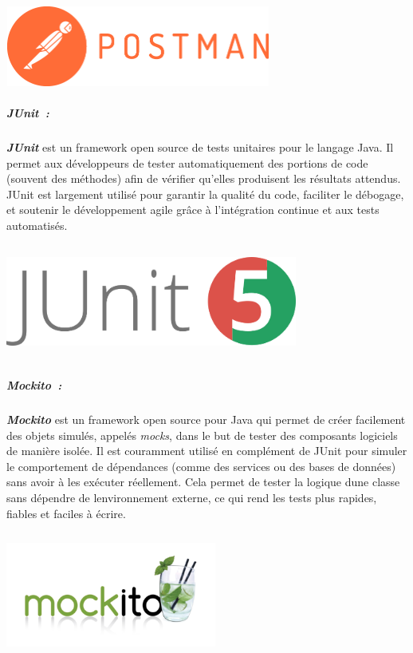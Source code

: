 \documentclass[12pt,a4paper,twoside]{report}
\begin{document}
\includegraphics[width=3.43681in,height=1.03958in]{latex_media/media/image33.png}

\hypertarget{junit}{%
\subparagraph{JUnit~:}\label{junit}}

\emph{\textbf{JUnit}} est un framework open source de tests unitaires
pour le langage Java. Il permet aux développeurs de tester
automatiquement des portions de code (souvent des méthodes) afin de
vérifier qu'elles produisent les résultats attendus. JUnit est largement
utilisé pour garantir la qualité du code, faciliter le débogage, et
soutenir le développement agile grâce à l'intégration continue et aux
tests automatisés.

\includegraphics[width=3.78403in,height=1.48333in]{latex_media/media/image34.png}

\hypertarget{mockito}{%
\subparagraph{Mockito~:}\label{mockito}}

\emph{\textbf{Mockito}} est un framework open source pour Java qui
permet de créer facilement des objets simulés, appelés \emph{mocks},
dans le but de tester des composants logiciels de manière isolée. Il est
couramment utilisé en complément de JUnit pour simuler le comportement
de dépendances (comme des services ou des bases de données) sans avoir à
les exécuter réellement. Cela permet de tester la logique
d\textquotesingle une classe sans dépendre de
l\textquotesingle environnement externe, ce qui rend les tests plus
rapides, fiables et faciles à écrire.

\includegraphics[width=2.72569in,height=1.62222in]{latex_media/media/image35.png}
\end{document}
